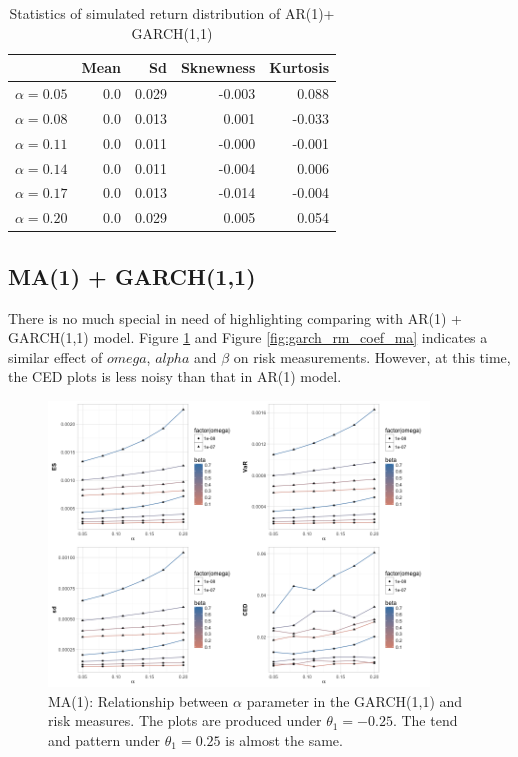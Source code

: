 \documentclass[11pt]{article}
\begin{document}
\begin{table}[H]
\centering
\begin{tabular}{|r |r r r r|}
\hline
& Mean & Sd & Sknewness & Kurtosis \\
\hline
$\alpha = 0.05 $ & 0.0 & 0.029 & -0.003 & 0.088\\
$\alpha = 0.08 $ & 0.0 & 0.013 & 0.001 & -0.033\\
$\alpha = 0.11 $ & 0.0 & 0.011 & -0.000 & -0.001\\
$\alpha = 0.14 $ & 0.0 & 0.011& -0.004 &  0.006\\
$\alpha = 0.17 $ & 0.0 & 0.013 & -0.014 & -0.004\\
$\alpha = 0.20 $ & 0.0 & 0.029 & 0.005 & 0.054\\
\hline
\end{tabular}
\caption{Statistics of simulated return distribution of AR(1)+ GARCH(1,1)}
\label{table:dist_garch_ar1_return}
\end{table}


\subsection{MA(1) + GARCH(1,1)}
There is no much special in need of highlighting comparing with AR(1) + GARCH(1,1) model. Figure \ref{fig:garch_rm_alpha1_ma} and Figure \ref{fig:garch_rm_coef_ma} indicates a similar effect of $omega$, $alpha$ and $\beta$ on risk measurements.  However, at this time, the CED plots is less noisy than that in AR(1) model.

\begin{figure}[H]
\centering
\includegraphics[width = 0.9\textwidth]{../figures/simulation_garch/garch_MA1_risk_measures_neg_alpha.png}
\caption{MA(1): Relationship between $\alpha$ parameter in the GARCH(1,1) and risk measures. The plots are produced under $\theta_1 = -0.25$. The tend and pattern under $\theta_1 = 0.25$ is almost the same.}
\label{fig:garch_rm_alpha1_ma}
\end{figure}
\end{document}
